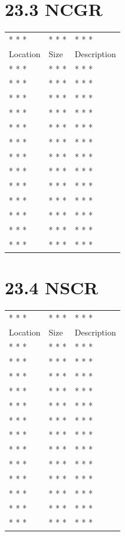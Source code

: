\documentclass[
]{book}
\begin{document}
\hypertarget{ncgr}{%
\section{23.3 NCGR}\label{ncgr}}

\begin{longtable}[]{@{}lll@{}}
\toprule()
\endhead
* * * & * * * & * * * \\
Location & Size & Description \\
* * * & * * * & * * * \\
* * * & * * * & * * * \\
* * * & * * * & * * * \\
* * * & * * * & * * * \\
* * * & * * * & * * * \\
* * * & * * * & * * * \\
* * * & * * * & * * * \\
* * * & * * * & * * * \\
* * * & * * * & * * * \\
* * * & * * * & * * * \\
* * * & * * * & * * * \\
* * * & * * * & * * * \\
* * * & * * * & * * * \\
\bottomrule()
\end{longtable}

\hypertarget{nscr}{%
\section{23.4 NSCR}\label{nscr}}

\begin{longtable}[]{@{}lll@{}}
\toprule()
\endhead
* * * & * * * & * * * \\
Location & Size & Description \\
* * * & * * * & * * * \\
* * * & * * * & * * * \\
* * * & * * * & * * * \\
* * * & * * * & * * * \\
* * * & * * * & * * * \\
* * * & * * * & * * * \\
* * * & * * * & * * * \\
* * * & * * * & * * * \\
* * * & * * * & * * * \\
* * * & * * * & * * * \\
* * * & * * * & * * * \\
* * * & * * * & * * * \\
* * * & * * * & * * * \\
\bottomrule()
\end{longtable}
\end{document}
